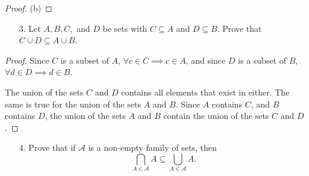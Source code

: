 \documentclass[10pt]{article}
\theoremstyle{definition}
\theoremstyle{plain}
\begin{document}
\begin{proof}{(b)}

\end{proof}



\pagebreak



\begin{enumerate}
  \item[3.] Let $A, B, C,$ and $D$ be sets with $C \subseteq A$ and $D \subseteq B$.  Prove that $C \cup D \subseteq A \cup B$.
\end{enumerate}

\begin{proof}
  Since $C$ is a subset of $A$, $\forall c\in C \implies c\in A$, and since $D$ is a subset of $B$, $\forall d\in D \implies d\in B$. \\

  \par The union of the sets $C$ and $D$ contains all elements that exist in either. The same is true for the union of the sets $A$ and $B$. Since $A$ contains $C$, and $B$ contains $D$, the union of the sets $A$ and $B$ contain the union of the sets $C$ and $D$.
\end{proof}



\pagebreak



\begin{enumerate}
  \item[4.] Prove that if $\mathcal{A}$ is a non-empty family of sets, then $$\bigcap_{A \in \mathcal{A}}A \subseteq \bigcup_{A \in \mathcal{A}} A.$$
\end{enumerate}
\end{document}
